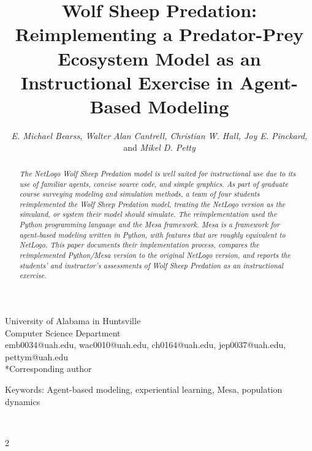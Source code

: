 \documentclass[12pt]{article}
\title{\large \textbf{Wolf Sheep Predation:  Reimplementing a Predator-Prey Ecosystem Model
    as an Instructional Exercise in Agent-Based Modeling}}
\author{\normalsize \textit{E. Michael Bearss, Walter Alan Cantrell, Christian W. Hall,
    Joy E. Pinckard,} and \textit{Mikel D. Petty}}
\date{}
\begin{document}
    \maketitle
    \noindent
    \begin{center}\vspace{-6ex}
        University of Alabama in Huntsville \\
        Computer Science Department \\
        emb0034@uah.edu, wac0010@uah.edu, ch0164@uah.edu, jep0037@uah.edu, pettym@uah.edu \\
        *Corresponding author \\
    \end{center}

    \begin{center}
        \noindent
        Keywords: Agent-based modeling, experiential learning, Mesa, population dynamics
    \end{center}

    \begin{abstract}
    \noindent
    \textit{
        The NetLogo Wolf Sheep Predation model is well suited for instructional use due
        to its use of familiar agents, concise source code, and simple graphics.
        As part of graduate course surveying modeling and simulation methods,
        a team of four students reimplemented the Wolf Sheep Predation model,
        treating the NetLogo version as the simuland, or system their model should simulate.
        The reimplementation used the Python programming language and the Mesa framework.
        Mesa is a framework for agent-based modeling written in Python,
        with features that are roughly equivalent to NetLogo.
        This paper documents their implementation process, compares the reimplemented
        Python/Mesa version to the original NetLogo version, and reports the students'
        and instructor's assessments of Wolf Sheep Predation as an instructional exercise.
    }
    \end{abstract}

    \begin{multicols}{2}
    
    
    
    
    ~\cite{python-mesa-2020}

    
    

\end{multicols}{2}
\end{document}
